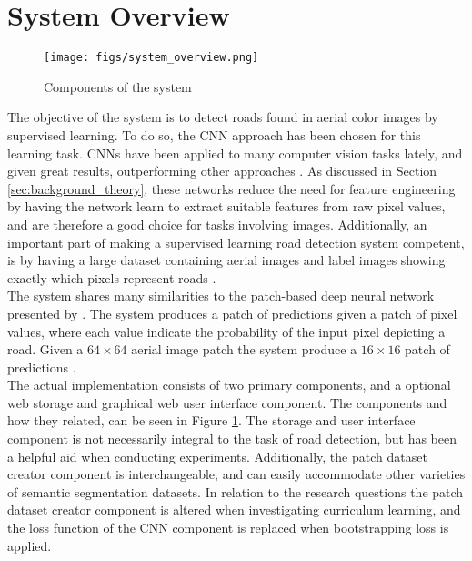 \section{System Overview}
\label{sec:systemOverview}

\begin{figure}[t]
\begin{center}
\texttt{[image: figs/system\_overview.png]}
\caption[Components of the system]{Components of the system}
\label{fig:system_components}
\end{center}
\end{figure}

The objective of the system is to detect roads found in aerial color images by supervised learning. To do so, the \ac{CNN} approach has been chosen for this learning task. \ac{CNN}s have been applied to many computer vision tasks lately, and given great results, outperforming other approaches \citep{Krizhevsky_imagenet} . As discussed in Section \ref{sec:background_theory}, these networks reduce the need for feature engineering by having the network learn to extract suitable features from raw pixel values, and are therefore a good choice for tasks involving images. Additionally, an important part of making a supervised learning road detection system competent, is by having a large dataset containing aerial images and label images showing exactly which pixels represent roads .\\


The system shares many similarities to the patch-based deep neural network presented by \cite{Mnih_aerial_images_noisy}. The system produces a patch of predictions given a patch of pixel values, where each value indicate the probability of the input pixel depicting a road. Given a $64 \times 64$ aerial image patch the system produce a $16 \times 16$ patch of predictions .\\


The actual implementation consists of two primary components, and a optional web storage and graphical web user interface component. The components and how they related, can be seen in Figure \ref{fig:system_components}. The storage and user interface component is not necessarily  integral to the task of road detection, but has been a helpful aid when conducting experiments. Additionally, the patch dataset creator component is interchangeable, and can easily accommodate other varieties of semantic segmentation datasets. In relation to the research questions the patch dataset creator component is altered when investigating curriculum learning, and the loss function of the \ac{CNN} component is replaced when bootstrapping loss is applied. \\


